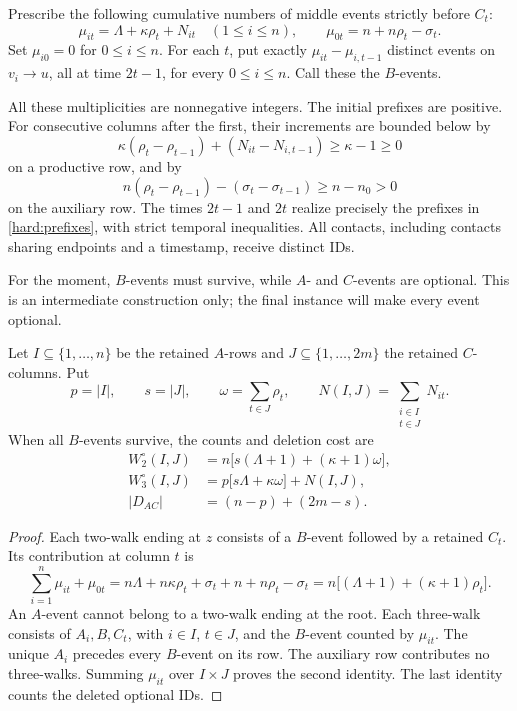 Prescribe the following cumulative numbers of middle events strictly
before \(C_t\):
\begin{equation}
\label{hard:prefixes}
 \mu_{it}=\Lambda+\kappa\rho_t+N_{it}
 \quad(1\le i\le n),\qquad
 \mu_{0t}=n+n\rho_t-\sigma_t .
\end{equation}
Set \(\mu_{i0}=0\) for \(0\le i\le n\).
For each \(t\), put exactly \(\mu_{it}-\mu_{i,t-1}\) distinct events
on \(v_i\to u\), all at time \(2t-1\), for every \(0\le i\le n\).
Call these the \(B\)-events.

All these multiplicities are nonnegative integers. The initial prefixes
are positive. For consecutive columns after the first, their increments
are bounded below by
\[
 \kappa(\rho_t-\rho_{t-1})+(N_{it}-N_{i,t-1})
 \ge\kappa-1\ge0
\]
on a productive row, and by
\[
 n(\rho_t-\rho_{t-1})-(\sigma_t-\sigma_{t-1})
 \ge n-n_0>0
\]
on the auxiliary row. The times \(2t-1\) and \(2t\) realize precisely the
prefixes in \eqref{hard:prefixes}, with strict temporal inequalities.
All contacts, including contacts sharing endpoints and a timestamp, receive
distinct IDs.

For the moment, \(B\)-events must survive, while \(A\)- and \(C\)-events are
optional. This is an intermediate construction only; the final instance
will make every event optional.

\begin{lemma}
\label{hard:counts}
Let \(I\subseteq\{1,\ldots,n\}\) be the retained \(A\)-rows and
\(J\subseteq\{1,\ldots,2m\}\) the retained \(C\)-columns. Put
\[
 p=|I|,\qquad s=|J|,\qquad
 \omega=\sum_{t\in J}\rho_t,\qquad
 N(I,J)=\sum_{\substack{i\in I\\t\in J}}N_{it}.
\]
When all \(B\)-events survive, the counts and deletion cost are
\begin{equation}
\label{hard:identities}
\begin{aligned}
 W_2^\circ(I,J)
   &=n\bigl[s(\Lambda+1)+(\kappa+1)\omega\bigr],\\
 W_3^\circ(I,J)
   &=p\bigl[s\Lambda+\kappa\omega\bigr]+N(I,J),\\
 |D_{AC}|&=(n-p)+(2m-s).
\end{aligned}
\end{equation}
\end{lemma}

\begin{proof}
Each two-walk ending at \(z\) consists of a \(B\)-event followed by a
retained \(C_t\). Its contribution at column \(t\) is
\[
 \sum_{i=1}^n\mu_{it}+\mu_{0t}
 =n\Lambda+n\kappa\rho_t+\sigma_t
    +n+n\rho_t-\sigma_t
 =n\bigl[(\Lambda+1)+(\kappa+1)\rho_t\bigr].
\]
An \(A\)-event cannot belong to a two-walk ending at the root.
Each three-walk consists of \(A_i,B,C_t\), with \(i\in I\), \(t\in J\),
and the \(B\)-event counted by \(\mu_{it}\). The unique \(A_i\) precedes
every \(B\)-event on its row. The auxiliary row contributes no three-walks.
Summing \(\mu_{it}\) over \(I\times J\) proves the second identity. The last
identity counts the deleted optional IDs.
\end{proof}

